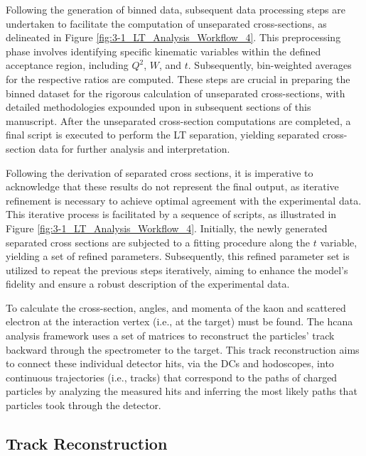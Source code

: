 \documentclass[
]{report}
\begin{document}


Following the generation of binned data, subsequent data processing
steps are undertaken to facilitate the computation of unseparated
cross-sections, as delineated in Figure
\ref{fig:3-1_LT_Analysis_Workflow_4}. This preprocessing phase involves
identifying specific kinematic variables within the defined acceptance
region, including \(Q^2\), \(W\), and \(t\). Subsequently, bin-weighted
averages for the respective ratios are computed. These steps are crucial
in preparing the binned dataset for the rigorous calculation of
unseparated cross-sections, with detailed methodologies expounded upon
in subsequent sections of this manuscript. After the unseparated
cross-section computations are completed, a final script is executed to
perform the LT separation, yielding separated cross-section data for
further analysis and interpretation.

Following the derivation of separated cross sections, it is imperative
to acknowledge that these results do not represent the final output, as
iterative refinement is necessary to achieve optimal agreement with the
experimental data. This iterative process is facilitated by a sequence
of scripts, as illustrated in Figure
\ref{fig:3-1_LT_Analysis_Workflow_4}. Initially, the newly generated
separated cross sections are subjected to a fitting procedure along the
\(t\) variable, yielding a set of refined parameters. Subsequently, this
refined parameter set is utilized to repeat the previous steps
iteratively, aiming to enhance the model's fidelity and ensure a robust
description of the experimental data.

\label{Chapter-3-2}

To calculate the cross-section, angles, and momenta of the kaon and
scattered electron at the interaction vertex (i.e., at the target) must
be found. The hcana analysis framework uses a set of matrices to
reconstruct the particles' track backward through the spectrometer to
the target. This track reconstruction aims to connect these individual
detector hits, via the DCs and hodoscopes, into continuous trajectories
(i.e., tracks) that correspond to the paths of charged particles by
analyzing the measured hits and inferring the most likely paths that
particles took through the detector.

\hypertarget{track-reconstruction}{%
\subsection{Track Reconstruction}\label{track-reconstruction}}
\end{document}
